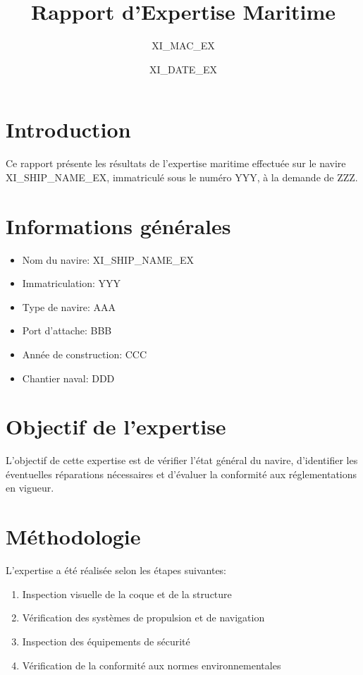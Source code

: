 \documentclass[12pt,a4paper]{article}
\title{Rapport d'Expertise Maritime}
\author{XI_MAC_EX}
\date{{\Large XI_DATE_EX}}
\begin{document}
\maketitle
\tableofcontents
\newpage

\section{Introduction}
Ce rapport présente les résultats de l'expertise maritime effectuée sur le navire XI_SHIP_NAME_EX, immatriculé sous le numéro YYY, à la demande de ZZZ.

\section{Informations générales}
\begin{itemize}
    \item Nom du navire: XI_SHIP_NAME_EX
    \item Immatriculation: YYY
    \item Type de navire: AAA
    \item Port d'attache: BBB
    \item Année de construction: CCC
    \item Chantier naval: DDD
\end{itemize}

\section{Objectif de l'expertise}
L'objectif de cette expertise est de vérifier l'état général du navire, d'identifier les éventuelles réparations nécessaires et d'évaluer la conformité aux réglementations en vigueur.

\section{Méthodologie}
L'expertise a été réalisée selon les étapes suivantes:
\begin{enumerate}
    \item Inspection visuelle de la coque et de la structure
    \item Vérification des systèmes de propulsion et de navigation
    \item Inspection des équipements de sécurité
    \item Vérification de la conformité aux normes environnementales
\end{enumerate}
\end{document}
